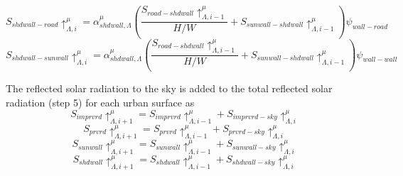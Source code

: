 \documentclass[12pt,authoryear]{elsarticle}
\numberwithin{equation}{section} %
\begin{document}
\begin{equation}
S_{shdwall-road}\uparrow_{\Lambda,i}^{\mu}=\alpha_{shdwall,\Lambda}^{\mu}\left(\frac{S_{road-shdwall}\uparrow_{\Lambda,i-1}^{\mu}}{H/W}+S_{sunwall-shdwall}\uparrow_{\Lambda,i-1}^{\mu}\right)\psi_{wall-road}
\end{equation}
\begin{equation}
S_{shdwall-sunwall}\uparrow_{\Lambda,i}^{\mu}=\alpha_{shdwall,\Lambda}^{\mu}\left(\frac{S_{road-shdwall}\uparrow_{\Lambda,i-1}^{\mu}}{H/W}+S_{sunwall-shdwall}\uparrow_{\Lambda,i-1}^{\mu}\right)\psi_{wall-wall}
\end{equation}

The reflected solar radiation to the sky is added to the total reflected solar radiation (step 5) for each urban surface as
\begin{equation}
S_{imprvrd}\uparrow_{\Lambda,i+1}^{\mu} = S_{imprvrd}\uparrow_{\Lambda,i-1}^{\mu} + S_{imprvrd-sky}\uparrow_{\Lambda,i}^{\mu}
\end{equation}
\begin{equation}
S_{prvrd}\uparrow_{\Lambda,i+1}^{\mu} = S_{prvrd}\uparrow_{\Lambda,i-1}^{\mu} + S_{prvrd-sky}\uparrow_{\Lambda,i}^{\mu}
\end{equation}
\begin{equation}
S_{sunwall}\uparrow_{\Lambda,i+1}^{\mu} = S_{sunwall}\uparrow_{\Lambda,i-1}^{\mu} + S_{sunwall-sky}\uparrow_{\Lambda,i}^{\mu}
\end{equation}
\begin{equation}
\label{eq:upward_solar_radiation_shdwall}
S_{shdwall}\uparrow_{\Lambda,i+1}^{\mu} = S_{shdwall}\uparrow_{\Lambda,i-1}^{\mu} + S_{shdwall-sky}\uparrow_{\Lambda,i}^{\mu}
\end{equation}
\end{document}
